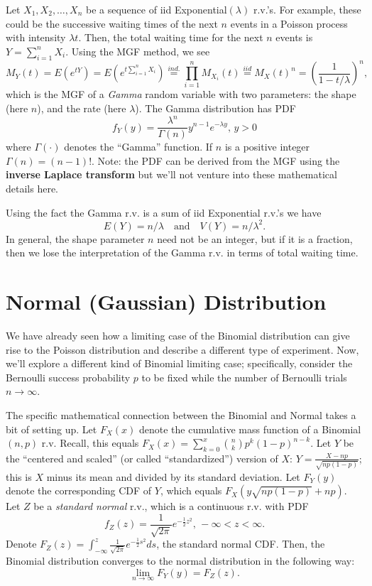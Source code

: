 \documentclass[]{book}
\begin{document}
Let \(X_1, X_2, \ldots, X_n\) be a sequence of iid
Exponential\((\lambda)\) r.v.'s. For example, these could be the
successive waiting times of the next \(n\) events in a Poisson process
with intensity \(\lambda t\). Then, the total waiting time for the next
\(n\) events is \(Y = \sum_{i=1}^n X_i\). Using the MGF method, we see
\[M_Y(t) = E(e^{tY}) = E(e^{t \sum_{i=1}^n X_i}) \stackrel{ind.}{=}\prod_{i=1}^n M_{X_i}(t)\stackrel{iid}{=}M_X(t)^n = \left(\frac{1}{1-t/\lambda}\right)^n,\]
which is the MGF of a \emph{Gamma} random variable with two parameters:
the shape (here \(n\)), and the rate (here \(\lambda\)). The Gamma
distribution has PDF
\[f_Y(y) = \frac{\lambda^n}{\Gamma(n)}y^{n-1}e^{-\lambda y},\, y>0\]
where \(\Gamma(\cdot)\) denotes the ``Gamma'' function. If \(n\) is a
positive integer \(\Gamma(n) = (n-1)!\). Note: the PDF can be derived
from the MGF using the \textbf{inverse Laplace transform} but we'll not
venture into these mathematical details here.

Using the fact the Gamma r.v. is a sum of iid Exponential r.v.'s we have
\[E(Y) = n/\lambda \quad\text{and}\quad V(Y) = n/\lambda^2.\] In
general, the shape parameter \(n\) need not be an integer, but if it is
a fraction, then we lose the interpretation of the Gamma r.v. in terms
of total waiting time.

\section{Normal (Gaussian)
Distribution}\label{normal-gaussian-distribution}

We have already seen how a limiting case of the Binomial distribution
can give rise to the Poisson distribution and describe a different type
of experiment. Now, we'll explore a different kind of Binomial limiting
case; specifically, consider the Bernoulli success probability \(p\) to
be fixed while the number of Bernoulli trials \(n\rightarrow \infty\).

The specific mathematical connection between the Binomial and Normal
takes a bit of setting up. Let \(F_X(x)\) denote the cumulative mass
function of a Binomial\((n,p)\) r.v. Recall, this equals
\(F_X(x) = \sum_{k=0}^x {n\choose k}p^k(1-p)^{n-k}\). Let \(Y\) be the
``centered and scaled'' (or called ``standardized'') version of \(X\):
\(Y = \frac{X - np}{\sqrt{np(1-p)}}\); this is \(X\) minus its mean and
divided by its standard deviation. Let \(F_Y(y)\) denote the
corresponding CDF of \(Y\), which equals \(F_X(y\sqrt{np(1-p)}+np)\).
Let \(Z\) be a \emph{standard normal} r.v., which is a continuous r.v.
with PDF
\[f_Z(z) = \frac{1}{\sqrt{2\pi}}e^{-\frac{1}{2}z^2}, \, -\infty < z < \infty.\]
Denote
\(F_Z(z) = \int_{-\infty}^z \frac{1}{\sqrt{2\pi}}e^{-\frac{1}{2}s^2}ds\),
the standard normal CDF. Then, the Binomial distribution converges to
the normal distribution in the following way:
\[\lim_{n\rightarrow\infty} F_Y(y) = F_Z(z).\]
\end{document}
